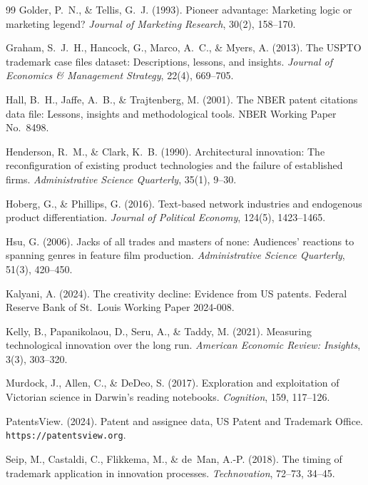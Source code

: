 \begin{thebibliography}{99}
Golder, P.~N., \& Tellis, G.~J. (1993). Pioneer advantage: Marketing logic or
marketing legend? \emph{Journal of Marketing Research}, 30(2), 158--170.

Graham, S.~J.~H., Hancock, G., Marco, A.~C., \& Myers, A. (2013). The USPTO
trademark case files dataset: Descriptions, lessons, and insights.
\emph{Journal of Economics \& Management Strategy}, 22(4), 669--705.

Hall, B.~H., Jaffe, A.~B., \& Trajtenberg, M. (2001). The NBER patent
citations data file: Lessons, insights and methodological tools. NBER
Working Paper No.\ 8498.

Henderson, R.~M., \& Clark, K.~B. (1990). Architectural innovation: The
reconfiguration of existing product technologies and the failure of
established firms. \emph{Administrative Science Quarterly}, 35(1), 9--30.

Hoberg, G., \& Phillips, G. (2016). Text-based network industries and
endogenous product differentiation. \emph{Journal of Political Economy},
124(5), 1423--1465.

Hsu, G. (2006). Jacks of all trades and masters of none: Audiences'
reactions to spanning genres in feature film production.
\emph{Administrative Science Quarterly}, 51(3), 420--450.

Kalyani, A. (2024). The creativity decline: Evidence from US patents.
Federal Reserve Bank of St.\ Louis Working Paper 2024-008.

Kelly, B., Papanikolaou, D., Seru, A., \& Taddy, M. (2021). Measuring
technological innovation over the long run. \emph{American Economic
Review: Insights}, 3(3), 303--320.

Murdock, J., Allen, C., \& DeDeo, S. (2017). Exploration and exploitation
of Victorian science in Darwin's reading notebooks. \emph{Cognition},
159, 117--126.

PatentsView. (2024). Patent and assignee data, US Patent and Trademark
Office. \texttt{https://patentsview.org}.

Seip, M., Castaldi, C., Flikkema, M., \& de~Man, A.-P. (2018). The timing
of trademark application in innovation processes. \emph{Technovation},
72--73, 34--45.


\end{thebibliography}
